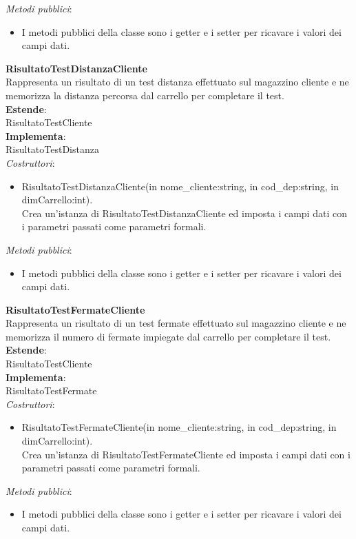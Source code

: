 \textit{Metodi pubblici}:\\
\begin{itemize}
    \item I metodi pubblici della classe sono i getter e i setter per ricavare i valori dei campi dati.\\
\end{itemize} 
\textbf{RisultatoTestDistanzaCliente}\\
Rappresenta un risultato di un test distanza effettuato sul magazzino cliente e ne memorizza la distanza percorsa dal carrello per completare il test.\\
\textbf{Estende}:\\
RisultatoTestCliente\\
\textbf{Implementa}:\\
RisultatoTestDistanza\\
\textit{Costruttori}:\\
\begin{itemize}
    \item RisultatoTestDistanzaCliente(in nome\_cliente:string, in cod\_dep:string, in dimCarrello:int).\\
    Crea un'istanza di RisultatoTestDistanzaCliente ed imposta i campi dati con i parametri passati come parametri formali.\\
\end{itemize}
\textit{Metodi pubblici}:\\
\begin{itemize}
    \item I metodi pubblici della classe sono i getter e i setter per ricavare i valori dei campi dati.\\
\end{itemize} 

\textbf{RisultatoTestFermateCliente}\\
Rappresenta un risultato di un test fermate effettuato sul magazzino cliente e ne memorizza il numero di fermate impiegate dal carrello per completare il test.\\
\textbf{Estende}:\\
RisultatoTestCliente\\
\textbf{Implementa}:\\
RisultatoTestFermate\\
\textit{Costruttori}:\\
\begin{itemize}
    \item RisultatoTestFermateCliente(in nome\_cliente:string, in cod\_dep:string, in dimCarrello:int).\\
    Crea un'istanza di RisultatoTestFermateCliente ed imposta i campi dati con i parametri passati come parametri formali.\\
\end{itemize}
\textit{Metodi pubblici}:\\
\begin{itemize}
    \item I metodi pubblici della classe sono i getter e i setter per ricavare i valori dei campi dati.\\
\end{itemize}


